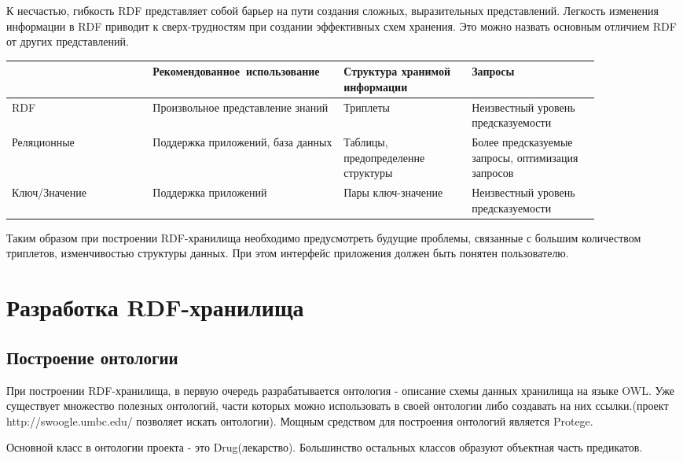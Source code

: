 \documentclass[specialist,subf,href,colorlinks=true
]{disser}
\begin{document}
К несчастью, гибкость RDF представляет собой барьер на пути создания сложных, выразительных представлений. Легкость изменения информации в RDF приводит к сверх-трудностям при создании эффективных схем хранения. Это можно назвать основным отличием RDF от других представлений.

\begin{tabular}{p{0.22\linewidth}|p{0.25\linewidth}|p{0.2\linewidth}|p{0.2\linewidth}}
\hline
& Рекомендованное\ использование & Структура хранимой информации & Запросы  \\
\hline
RDF & Произвольное представление знаний & Триплеты & Неизвестный уровень предсказуемости \\
\hline
Реляционные & Поддержка приложений, база данных & Таблицы, предопределенне структуры & Более предсказуемые запросы, оптимизация запросов \\
\hline
Ключ/Значение & Поддержка приложений& Пары ключ-значение & Неизвестный уровень предсказуемости \\
\hline
\end{tabular}

Таким образом при построении RDF-хранилища необходимо предусмотреть будущие проблемы, связанные с большим количеством триплетов, изменчивостью структуры данных. При этом интерфейс приложения должен быть понятен пользователю. 

\chapter{Разработка RDF-хранилища}

\section{Построение онтологии}
При построении RDF-хранилища, в первую очередь разрабатывается онтология - описание схемы данных хранилища на языке OWL. Уже существует множество полезных онтологий, части которых можно использовать в своей онтологии либо создавать на них ссылки.(проект http://swoogle.umbc.edu/ позволяет искать онтологии). Мощным средством для построения онтологий является Protege.

Основной класс в онтологии проекта - это Drug(лекарство). Большинство остальных классов образуют объектная часть предикатов.
\end{document}
